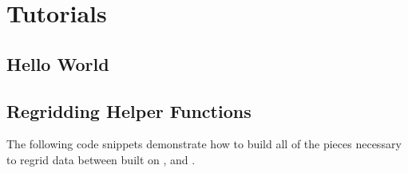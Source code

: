 \documentclass[letterpaper,10pt,english]{sphinxmanual}
\begin{document}
\chapter{Tutorials}
\label{\detokenize{examples:tutorials}}\label{\detokenize{examples::doc}}

\section{Hello World}
\label{\detokenize{examples:hello-world}}\begin{quote}

\begin{sphinxVerbatim}[commandchars=\\\{\}]
 


 
\end{sphinxVerbatim}
\end{quote}


\section{Regridding Helper Functions}
\label{\detokenize{examples:regridding-helper-functions}}
The following code snippets demonstrate how to build all of the pieces
necessary to regrid data between {\hyperref[\detokenize{field:ESMF.api.field.Field}]{}} built on
{\hyperref[\detokenize{grid:ESMF.api.grid.Grid}]{}}, {\hyperref[\detokenize{mesh:ESMF.api.mesh.Mesh}]{}}
and {\hyperref[\detokenize{locstream:ESMF.api.locstream.LocStream}]{}}.
\end{document}
